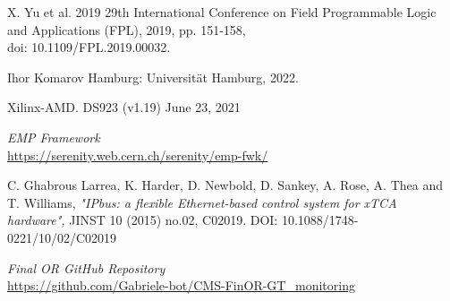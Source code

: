 \begin{thebibliography}{99}
X. Yu et al.
2019 29th International Conference on Field Programmable Logic and Applications (FPL), 2019, pp. 151-158, \\
doi: 10.1109/FPL.2019.00032.

Ihor Komarov
Hamburg: Universität Hamburg, 2022.

Xilinx-AMD.
DS923 (v1.19) June 23, 2021

\textit{EMP Framework}
\\\url{https://serenity.web.cern.ch/serenity/emp-fwk/}

C. Ghabrous Larrea, K. Harder, D. Newbold, D. Sankey, A. Rose, A. Thea and T. Williams,
\textit{"IPbus: a flexible Ethernet-based control system for xTCA hardware",}
JINST 10 (2015) no.02, C02019. DOI: 10.1088/1748-0221/10/02/C02019

\textit{Final OR GitHub Repository}
\\\url{https://github.com/Gabriele-bot/CMS-FinOR-GT_monitoring}

\end{thebibliography}

